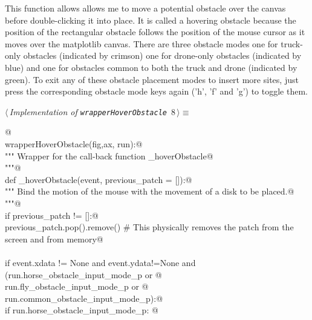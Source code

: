 \documentclass[11.5pt]{report}
\begin{document}
This function allows allows me to move a potential obstacle over the canvas before double-clicking it into place. It is called a hovering obstacle because
the position of the rectangular obstacle follows the position of the mouse cursor as it moves over the matplotlib canvas. There are three obstacle modes
one for truck-only obstacles (indicated by crimson) one for drone-only obstacles (indicated by blue) and one for obstacles common to both the truck and 
drone (indicated by green). To exit any of these obstacle placement modes to insert more sites, just press the corresponding obstacle mode keys again ('h', 'f' and 'g')
to toggle them. 

\begin{flushleft} \small\label{scrap8}\raggedright\small
{} $\langle\,${\itshape Implementation of \verb|wrapperHoverObstacle|}\nobreak\ {\footnotesize {8}}$\,\rangle\equiv$
\vspace{-1ex}
\begin{list}{}{} \item
\mbox{}\verb@   @\\
\mbox{}\verb@def wrapperHoverObstacle(fig,ax, run):@\\
\mbox{}\verb@        """ Wrapper for the call-back function _hoverObstacle@\\
\mbox{}\verb@        """@\\
\mbox{}\verb@        def _hoverObstacle(event, previous_patch = []):@\\
\mbox{}\verb@          """ Bind the motion of the mouse with the movement of a disk to be placed.@\\
\mbox{}\verb@          """@\\
\mbox{}\verb@          if previous_patch != []:@\\
\mbox{}\verb@              previous_patch.pop().remove() # This physically removes the patch from the screen and from memory@\\
\mbox{}\verb@@\\
\mbox{}\verb@          if event.xdata != None and event.ydata!=None and (run.horse_obstacle_input_mode_p  or @\\
\mbox{}\verb@                                                            run.fly_obstacle_input_mode_p    or @\\
\mbox{}\verb@                                                            run.common_obstacle_input_mode_p):@\\
\mbox{}\verb@              if run.horse_obstacle_input_mode_p: @\\

\end{list}
\end{flushleft}
\end{document}
